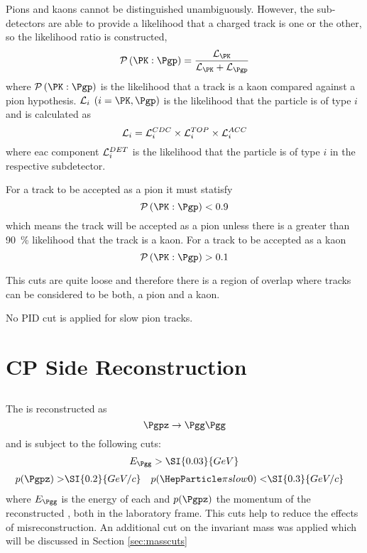 \documentclass[a4paper]{report}
\begin{document}
Pions and kaons cannot be distinguished unambiguously. However, the
sub-detectors are able to provide a likelihood that a charged track is one or
the other, so the likelihood ratio is constructed,
\[
\mathcal{P}\left( \PK : \Pgp \right) =
\frac{\LH_{\PK}}{\LH_{\PK} +
\LH_{\Pgp}}
\]
where $\mathcal{P}\left( \PK : \Pgp \right)$ is the likelihood that a track is a
kaon compared against a pion hypothesis. $\mathcal{L}_i$ $(i = \PK, \Pgp)$ is
the likelihood that the particle is of type $i$ and is calculated as
\[ \mathcal{L}_i = \mathcal{L}_i^{CDC} \times \mathcal{L}_i^{TOP} \times \mathcal{L}_i^{ACC} \]
where eac component $\mathcal{L}_i^{DET}$ is the likelihood that the particle is of type
$i$ in the respective subdetector.


For a track to be accepted as a pion it must statisfy
\[ \mathcal{P}\left( \PK : \Pgp \right) < 0.9 \]
which means the track will be accepted as a pion unless there is a greater than
\SI{90}{\%} likelihood that the track is a kaon. For a track to be accepted as a
kaon
\[ \mathcal{P}\left( \PK : \Pgp \right) > 0.1 \]

This cuts are quite loose and therefore there is a region of overlap where
tracks can be considered to be both, a pion and a kaon.

No PID cut is applied for slow pion tracks.

\section{CP Side Reconstruction}

\subsection{\Pgpz}
The \Pgpz is reconstructed as
\[\Pgpz \rightarrow \Pgg\Pgg\]
and is subject to the following cuts:
\[ E_{\Pgg} > \SI{0.03}{GeV} \]
\begin{align*}
    p(\Pgpz) >& \SI{0.2}{GeV/c}&
    p(\Pgpzs)<& \SI{0.3}{GeV/c}
\end{align*}
where $E_{\Pgg}$ is the energy of each \Pgg  and $p(\Pgpz)$ the momentum of the
reconstructed \Pgpz, both in the laboratory frame. This cuts help to reduce the
effects of misreconstruction. An additional cut on the invariant mass was
applied which will be discussed in Section \ref{sec:masscuts}

\subsection{\PKzS}
\end{document}
